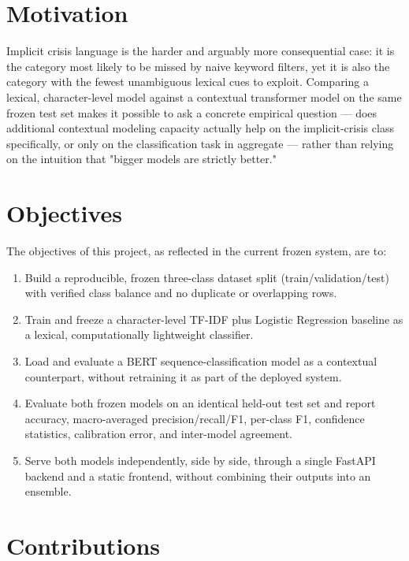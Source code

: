 \section{Motivation}

Implicit crisis language is the harder and arguably more consequential case: it is the category most likely to be missed by naive keyword filters, yet it is also the category with the fewest unambiguous lexical cues to exploit. Comparing a lexical, character-level model against a contextual transformer model on the same frozen test set makes it possible to ask a concrete empirical question --- does additional contextual modeling capacity actually help on the implicit-crisis class specifically, or only on the classification task in aggregate --- rather than relying on the intuition that "bigger models are strictly better."

\section{Objectives}

The objectives of this project, as reflected in the current frozen system, are to:

\begin{enumerate}[nosep]
  \item Build a reproducible, frozen three-class dataset split (train/validation/test) with verified class balance and no duplicate or overlapping rows.
  \item Train and freeze a character-level TF-IDF plus Logistic Regression baseline as a lexical, computationally lightweight classifier.
  \item Load and evaluate a BERT sequence-classification model as a contextual counterpart, without retraining it as part of the deployed system.
  \item Evaluate both frozen models on an identical held-out test set and report accuracy, macro-averaged precision/recall/F1, per-class F1, confidence statistics, calibration error, and inter-model agreement.
  \item Serve both models independently, side by side, through a single FastAPI backend and a static frontend, without combining their outputs into an ensemble.
\end{enumerate}

\section{Contributions}

